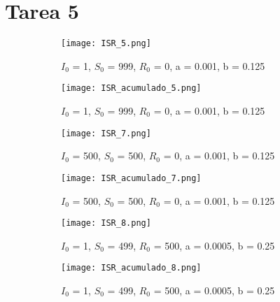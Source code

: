 \section{Tarea 5}
\begin{figure}[H]
	\centering
	\begin{subfigure}[b]{0.8\textwidth}
		\centering
		\texttt{[image: ISR\_5.png]}
		\caption{$I_0$ = 1, $S_0$ = 999, $R_0$ = 0, a = 0.001, b = 0.125}
	\end{subfigure}
	\hfill
	\begin{subfigure}[b]{0.8\textwidth}
		\centering
		\texttt{[image: ISR\_acumulado\_5.png]}
		\caption{$I_0$ = 1, $S_0$ = 999, $R_0$ = 0, a = 0.001, b = 0.125}
	\end{subfigure}
	\caption{}
\end{figure}
\begin{figure}[H]
	\centering
	\begin{subfigure}[b]{0.8\textwidth}
		\centering
		\texttt{[image: ISR\_7.png]}
		\caption{$I_0$ = 500, $S_0$ = 500, $R_0$ = 0, a = 0.001, b = 0.125}
	\end{subfigure}
	\hfill
	\begin{subfigure}[b]{0.8\textwidth}
		\centering
		\texttt{[image: ISR\_acumulado\_7.png]}
		\caption{$I_0$ = 500, $S_0$ = 500, $R_0$ = 0, a = 0.001, b = 0.125}
	\end{subfigure}
	\caption{}
\end{figure}
\begin{figure}[H]
	\centering
	\begin{subfigure}[b]{0.8\textwidth}
		\centering
		\texttt{[image: ISR\_8.png]}
		\caption{$I_0$ = 1, $S_0$ = 499, $R_0$ = 500, a = 0.0005, b = 0.25}
	\end{subfigure}
	\hfill
	\begin{subfigure}[b]{0.8\textwidth}
		\centering
		\texttt{[image: ISR\_acumulado\_8.png]}
		\caption{$I_0$ = 1, $S_0$ = 499, $R_0$ = 500, a = 0.0005, b = 0.25}
	\end{subfigure}
	\caption{}
\end{figure}

